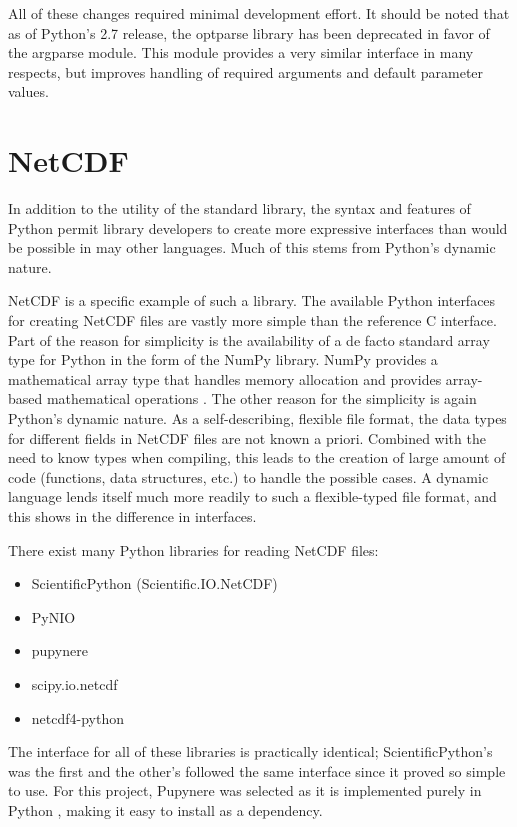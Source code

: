 \documentclass[twocolumn]{article}
\begin{document}
All of these changes required minimal development effort. It should be noted
that as of Python's 2.7 release, the optparse library has been deprecated in
favor of the argparse module. This module provides a very similar interface
in many respects, but improves handling of required arguments and default
parameter values. \cite{optparse}

\section{NetCDF}
In addition to the utility of the standard library, the syntax and features of Python
permit library developers to create more expressive interfaces than would be possible
in may other languages. Much of this stems from Python's dynamic nature.

NetCDF is a specific example of such a library. The available Python interfaces
for creating NetCDF files are vastly more simple than the reference C interface.
Part of the reason for simplicity is the availability of a de facto standard
array type for Python in the form of the NumPy library. NumPy provides a
mathematical array type that handles memory allocation and provides array-based
mathematical operations \cite{numpy}. The other reason for the simplicity is
again Python's dynamic nature. As a self-describing, flexible file format, the
data types for different fields in NetCDF files are not known a priori. Combined
with the need to know types when compiling, this leads to the creation of large
amount of code (functions, data structures, etc.) to handle the possible cases.
A dynamic language lends itself much more readily to such a flexible-typed file
format, and this shows in the difference in interfaces.

There exist many Python libraries for reading NetCDF files:
\begin{itemize}
  \item ScientificPython (Scientific.IO.NetCDF)
  \item PyNIO
  \item pupynere
  \item scipy.io.netcdf
  \item netcdf4-python
\end{itemize}
The interface for all of these libraries is practically identical; ScientificPython's
was the first and the other's followed the same interface since it proved so
simple to use. For this project, Pupynere was selected as it is implemented
purely in Python \cite{pupynere}, making it easy to install as a dependency.
\end{document}
